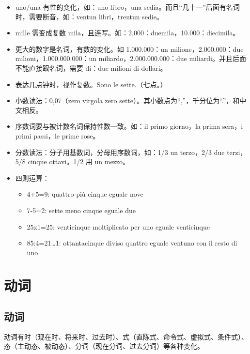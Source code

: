 \documentclass[UTF8,a4paper,titlepage,10pt]{report}
\begin{document}
\begin{enumerate}
\begin{itemize}
\item uno/una 有性的变化，如：uno libro，una sedia。而且“几十一”后面有名词时，需要断音，如：ventun libri，trentun sedie。
\item mille 需变成复数 mila，且连写。如：2.000：duemila，10.000：diecimila。
\item 更大的数字是名词，有数的变化。如 1.000.000：un milione，2.000.000：due milioni，1.000.000.000：un miliardo，2.000.000.000：due miliardi。并且后面不能直接跟名词，需要 di：due milioni di dollari。
\item 表达几点钟时，视作复数。Sono le sette.（七点。）
\item 小数读法：0,07（zero virgola zero sette）。其小数点为``,''，千分位为``.''，和中文相反。
\item 序数词要与被计数名词保持性数一致。如：il primo giorno，la prima sera，i primi passi，le prime rose。
\item 分数读法：分子用基数词，分母用序数词，如：1/3 un terzo，2/3 due terzi，5/8 cinque ottavi。1/2 用 un mezzo。
\item 四则运算：
\begin{itemize}
\item 4+5=9: quattro più cinque eguale nove
\item 7-5=2: sette meno cinque eguale due
\item 25x1=25: venticinque moltiplicato per uno eguale venticinque
\item 85:4=21\ldots{}1: ottantacinque diviso quattro eguale ventuno con il resto di uno
\end{itemize}
\end{itemize}
\end{enumerate}

\chapter{动词}
\label{sec:org4944a2d}

\section{动词}
\label{sec:orgad2104f}

动词有时（现在时、将来时、过去时）、式（直陈式、命令式、虚拟式、条件式）、态（主动态、被动态）、分词（现在分词、过去分词）等各种变化。
\end{document}
